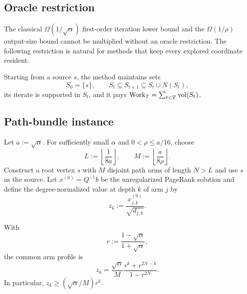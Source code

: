 \subsection{Oracle restriction}

The classical $\Omega(1/\sqrt\alpha)$ first-order iteration lower bound and
the $\Omega(1/\rho)$ output-size bound cannot be multiplied without an oracle
restriction.  The following restriction is natural for methods that keep
every explored coordinate resident.

\begin{definition}
Starting from a source $s$, the method maintains sets
\begin{equation}
 S_0=\{s\},
 \qquad
 S_t\subseteq S_{t+1}\subseteq S_t\cup N(S_t),
 \label{eq:persistent-oracle}
\end{equation}
its iterate is supported in $S_t$, and it pays
$\operatorname{Work}_T=\sum_{t<T}\operatorname{vol}(S_t)$.
\end{definition}

\subsection{Path-bundle instance}

Let $a:=\sqrt\alpha$.  For sufficiently small $\alpha$ and
$0<\rho\le a/16$, choose
\begin{equation}
 L:=\left\lfloor\frac1{8a}\right\rfloor,
 \qquad
 M:=\left\lfloor\frac{a}{8\rho}\right\rfloor.
 \label{eq:path-bundle-parameters}
\end{equation}
Construct a root vertex $s$ with $M$ disjoint path arms of length $N>L$ and
use $s$ as the source.  Let $x^{(0)}=Q^{-1}b$ be the unregularized PageRank
solution and define the degree-normalized value at depth $k$ of arm $j$ by
\[
 z_k:=\frac{x^{(0)}_{j,k}}{\sqrt{d_{j,k}}}.
\]

\begin{lemma}
\label{lem:arm-profile}
With
\begin{equation}
 r:=\frac{1-\sqrt\alpha}{1+\sqrt\alpha},
 \label{eq:path-root}
\end{equation}
the common arm profile is
\begin{equation}
 z_k
 =\frac{\sqrt\alpha}{M}
   \frac{r^k+r^{2N-k}}{1-r^{2N}}.
 \label{eq:arm-profile}
\end{equation}
In particular, $z_k\ge(\sqrt\alpha/M)r^k$.
\end{lemma}

